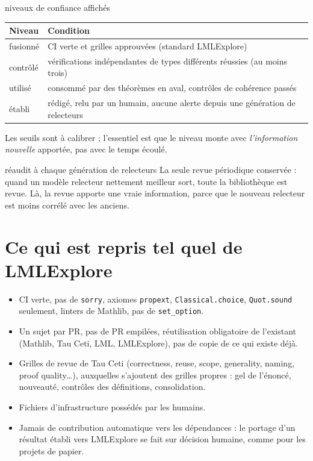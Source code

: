 \documentclass[11pt,a4paper]{article}
\newcommand{\lmlx}{\textsf{LMLExplore}}
\begin{document}
\begin{regle}{niveaux de confiance affichés}
\begin{center}
\begin{tabularx}{0.95\linewidth}{@{}lX@{}}
\toprule
Niveau & Condition \\
\midrule
fusionné & CI verte et grilles approuvées (standard \lmlx{}) \\
contrôlé & vérifications indépendantes de types différents réussies (au moins trois) \\
utilisé & consommé par des théorèmes en aval, contrôles de cohérence passés \\
établi & rédigé, relu par un humain, aucune alerte depuis une génération de relecteurs \\
\bottomrule
\end{tabularx}
\end{center}
Les seuils sont à calibrer ; l'essentiel est que le niveau monte avec \emph{l'information nouvelle}
apportée, pas avec le temps écoulé.
\end{regle}

\begin{regle}{réaudit à chaque génération de relecteurs}
La seule revue périodique conservée : quand un modèle relecteur nettement meilleur sort, toute la
bibliothèque est revue. Là, la revue apporte une vraie information, parce que le nouveau relecteur est
moins corrélé avec les anciens.
\end{regle}

\section{Ce qui est repris tel quel de \lmlx{}}\label{sec:repris}

\begin{itemize}
\item CI verte, pas de \texttt{sorry}, axiomes \texttt{propext}, \texttt{Classical.choice}, \texttt{Quot.sound}
  seulement, linters de Mathlib, pas de \texttt{set\_option}.
\item Un sujet par PR, pas de PR empilées, réutilisation obligatoire de l'existant (Mathlib, Tau Ceti,
  LML, \lmlx{}), pas de copie de ce qui existe déjà.
\item Grilles de revue de Tau Ceti (correctness, reuse, scope, generality, naming, proof quality\dots),
  auxquelles s'ajoutent des grilles propres : gel de l'énoncé, nouveauté, contrôles des définitions,
  consolidation.
\item Fichiers d'infrastructure possédés par les humains.
\item Jamais de contribution automatique vers les dépendances : le portage d'un résultat établi vers
  \lmlx{} se fait sur décision humaine, comme pour les projets de papier.
\end{itemize}
\end{document}
